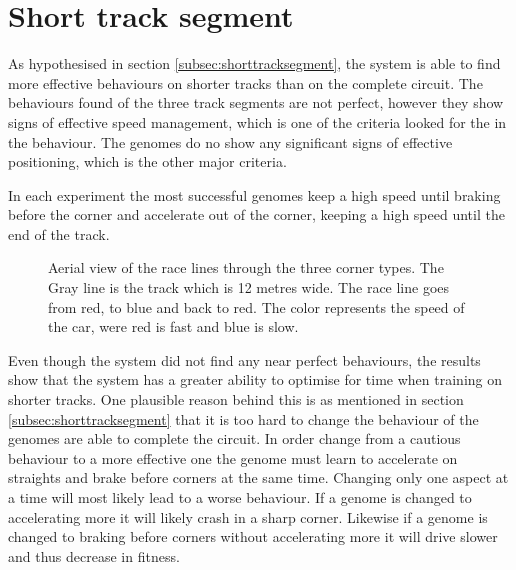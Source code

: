 
\section{Short track segment}
\label{result:short}
As hypothesised in section \ref{subsec:shorttracksegment}, the system is able to find more effective behaviours on shorter tracks than on the complete circuit. The behaviours found of the three track segments are not perfect, however they show signs of effective speed management, which is one of the criteria looked for the in the behaviour. The genomes do no show any significant signs of effective positioning, which is the other major criteria. 

In each experiment the most successful genomes keep a high speed until braking before the corner and accelerate out of the corner, keeping a high speed until the end of the track. 

\begin{figure}[H]
    \centering
    \qquad
    \qquad

    \caption{Aerial view of the race lines through the three corner types. The Gray line is the track which is 12 metres wide. The race line goes from red, to blue and back to red. The color represents the speed of the car, were red is fast and blue is slow.}
\end{figure}

Even though the system did not find any near perfect behaviours, the results show that the system has a greater ability to optimise for time when training on shorter tracks. One plausible reason behind this is as mentioned in section \ref{subsec:shorttracksegment} that it is too hard to change the behaviour of the genomes are able to complete the circuit. In order change from a cautious behaviour to a more effective one the genome must learn to accelerate on straights and brake before corners at the same time. Changing only one aspect at a time will most likely lead to a worse behaviour. If a genome is changed to accelerating more it will likely crash in a sharp corner. Likewise if a genome is changed to braking before corners without accelerating more it will drive slower and thus decrease in fitness.  


